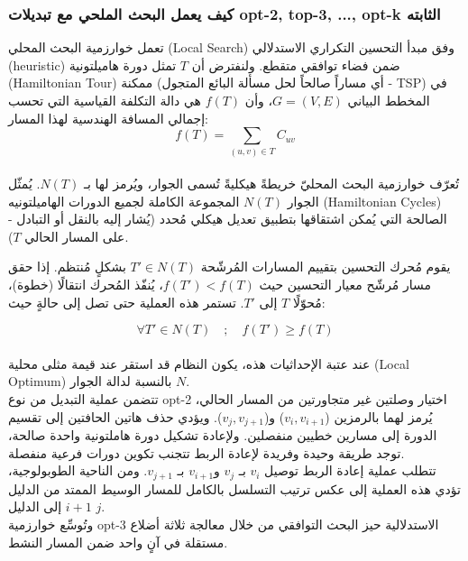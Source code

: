 \documentclass{article}
\newcommand{\en}[1]{\textenglish{#1}}
\begin{document}
\subsubsection{كيف يعمل البحث الملحي مع تبديلات \en{opt-2, top-3, ..., opt-k} الثابته}
تعمل خوارزمية البحث المحلي (\en{Local Search}) وفق مبدأ التحسين التكراري الاستدلالي (\en{heuristic}) ضمن فضاء توافقي متقطع. ولنفترض أن $T$ تمثل دورة هاميلتونية (\en{Hamiltonian Tour}) ممكنة (أي مساراً صالحاً لحل مسألة البائع المتجول - \en{TSP}) في المخطط البياني $G = (V, E)$، وأن $f(T)$ هي دالة التكلفة القياسية التي تحسب إجمالي المسافة الهندسية لهذا المسار:\\

{\LARGE$$
f(T) = \sum_{(u,v) \in T} C_{uv}
$$}\\

تُعرّف خوارزمية البحث المحليّ خريطةً هيكليةً تُسمى الجوار، ويُرمز لها بـ $N(T)$. يُمثّل الجوار $N(T)$ المجموعة الكاملة لجميع الدورات الهاميلتونيه (\en{Hamiltonian Cycles}) الصالحة التي يُمكن اشتقاقها بتطبيق تعديل هيكلي مُحدد (يُشار إليه بالنقل أو التبادل - على المسار الحالي $T$).

يقوم مُحرك التحسين بتقييم المسارات المُرشّحة $T' ∈ N(T)$ بشكلٍ مُنتظم. إذا حقق مسار مُرشّح معيار التحسين حيث $f(T') < f(T)$، يُنفّذ المُحرك انتقالًا (خطوة)، مُحوّلًا $T$ إلى $T'$. تستمر هذه العملية حتى تصل إلى حالةٍ حيث:

{\LARGE$$
\forall T' \in N(T) \quad ; \quad f(T') \ge f(T)
$$}\\

عند عتبة الإحداثيات هذه، يكون النظام قد استقر عند قيمة مثلى محلية (\en{Local Optimum}) بالنسبة لدالة الجوار $N$.\\

تتضمن عملية التبديل من نوع \en{opt-2} اختيار وصلتين غير متجاورتين من المسار الحالي، يُرمز لهما بالرمزين ($v_i, v_{i+1}$) و($v_j, v_{j+1}$). ويؤدي حذف هاتين الحافتين إلى تقسيم الدورة إلى مسارين خطيين منفصلين. ولإعادة تشكيل دورة هاملتونية واحدة صالحة، توجد طريقة وحيدة وفريدة لإعادة الربط تتجنب تكوين دورات فرعية منفصلة.\\

تتطلب عملية إعادة الربط توصيل $v_i$ بـ $v_j$ و$v_{i+1}$ بـ $v_{j+1}$. ومن الناحية الطوبولوجية، تؤدي هذه العملية إلى عكس ترتيب التسلسل بالكامل للمسار الوسيط الممتد من الدليل $i+1$ إلى الدليل $j$.\\

وتُوسِّع خوارزمية \en{opt-3} الاستدلالية حيز البحث التوافقي من خلال معالجة ثلاثة أضلاع مستقلة في آنٍ واحد ضمن المسار النشط.\\
\end{document}
